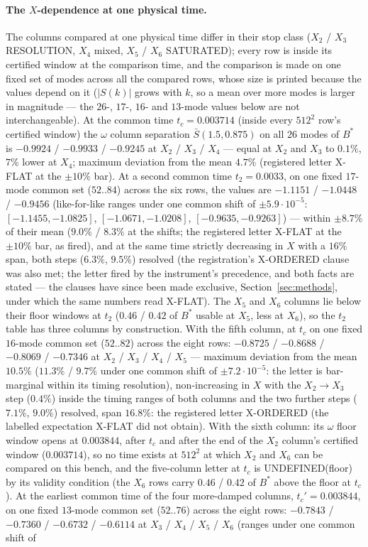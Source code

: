 \documentclass[11pt,a4paper]{article}
\newcommand{\abs}[1]{\lvert #1 \rvert}
\newcommand{\Bst}{B^*}
\newcommand{\Sbar}{\bar S}
\begin{document}
\paragraph{The $X$-dependence at one physical time.} The columns compared at one physical time differ in their stop class ($X_2$ / $X_3$ RESOLUTION, $X_4$ mixed, $X_5$ / $X_6$ SATURATED); every row is inside its certified window at the comparison time, and the comparison is made on one fixed set of modes across all the compared rows, whose size is printed because the values depend on it ($\abs{S(k)}$ grows with $k$, so a mean over more modes is larger in magnitude --- the $26$-, $17$-, $16$- and $13$-mode values below are not interchangeable). At the common time $t_c=0.003714$ (inside every $512^2$ row's certified window) the $\omega$ column separation $\Sbar(1.5,0.875)$ on all $26$ modes of $\Bst$ is $-0.9924$ / $-0.9933$ / $-0.9245$ at $X_2$ / $X_3$ / $X_4$ --- equal at $X_2$ and $X_3$ to $0.1\%$, $7\%$ lower at $X_4$; maximum deviation from the mean $4.7\%$ (registered letter X-FLAT at the $\pm10\%$ bar). At a second common time $t_2=0.0033$, on one fixed $17$-mode common set ($52..84$) across the six rows, the values are $-1.1151$ / $-1.0448$ / $-0.9456$ (like-for-like ranges under one common shift of $\pm5.9\cdot10^{-5}$: $[-1.1455,-1.0825]$, $[-1.0671,-1.0208]$, $[-0.9635,-0.9263]$) --- within $\pm8.7\%$ of their mean ($9.0\%$ / $8.3\%$ at the shifts; the registered letter X-FLAT at the $\pm10\%$ bar, as fired), and at the same time strictly decreasing in $X$ with a $16\%$ span, both steps ($6.3\%$, $9.5\%$) resolved (the registration's X-ORDERED clause was also met; the letter fired by the instrument's precedence, and both facts are stated --- the clauses have since been made exclusive, Section~\ref{sec:methods}, under which the same numbers read X-FLAT). The $X_5$ and $X_6$ columns lie below their floor windows at $t_2$ ($0.46$ / $0.42$ of $\Bst$ usable at $X_5$, less at $X_6$), so the $t_2$ table has three columns by construction. With the fifth column, at $t_c$ on one fixed $16$-mode common set ($52..82$) across the eight rows: $-0.8725$ / $-0.8688$ / $-0.8069$ / $-0.7346$ at $X_2$ / $X_3$ / $X_4$ / $X_5$ --- maximum deviation from the mean $10.5\%$ ($11.3\%$ / $9.7\%$ under one common shift of $\pm7.2\cdot10^{-5}$: the letter is bar-marginal within its timing resolution), non-increasing in $X$ with the $X_2\to X_3$ step ($0.4\%$) inside the timing ranges of both columns and the two further steps ($7.1\%$, $9.0\%$) resolved, span $16.8\%$: the registered letter X-ORDERED (the labelled expectation X-FLAT did not obtain). With the sixth column: its $\omega$ floor window opens at $0.003844$, after $t_c$ and after the end of the $X_2$ column's certified window ($0.003714$), so no time exists at $512^2$ at which $X_2$ and $X_6$ can be compared on this bench, and the five-column letter at $t_c$ is UNDEFINED(floor) by its validity condition (the $X_6$ rows carry $0.46$ / $0.42$ of $\Bst$ above the floor at $t_c$). At the earliest common time of the four more-damped columns, $t_c'=0.003844$, on one fixed $13$-mode common set ($52..76$) across the eight rows: $-0.7843$ / $-0.7360$ / $-0.6732$ / $-0.6114$ at $X_3$ / $X_4$ / $X_5$ / $X_6$ (ranges under one common shift of 
\end{document}
